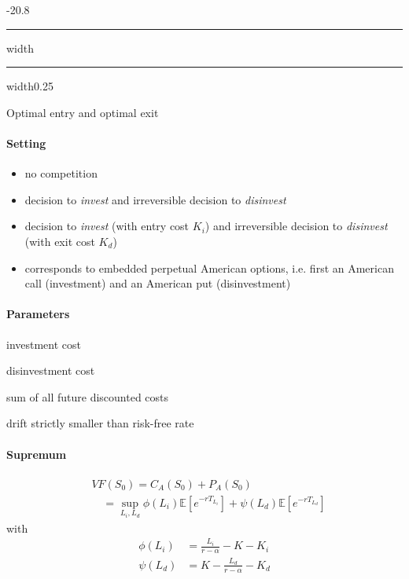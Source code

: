 \documentclass[a4paper,landscape,8pt,fleqn]{scrartcl}
\makeatletter
\renewcommand{\subsection}{\@startsection{subsection}{1}{0mm}%
{-2\baselineskip}{0.8\baselineskip}%
{\hrule depth 0.2pt width\columnwidth\hrule depth0.75pt
width0.25\columnwidth\vspace*{1.2em}\large\bfseries}}
\makeatother
\begin{document}
\begin{multicols*}{4}
\subsection{Optimal entry and optimal exit}

\paragraph{Setting}
\begin{itemize}
\item no competition
\item decision to \textit{invest} and irreversible decision to \textit{disinvest}
\item decision to \textit{invest} (with entry cost $K_i$) and irreversible decision to \textit{disinvest} (with exit cost $K_d$)
\item corresponds to embedded perpetual American options, i.e. first an American call (investment) and an American put (disinvestment)
\end{itemize}

\paragraph{Parameters}
\begin{description}[style=multiline,leftmargin=1cm,font=\textbf]
\item[$K_i$] investment cost
\item[$K_d$] disinvestment cost
\item[$K$] sum of all future discounted costs
\item[$\alpha < r$] drift strictly smaller than risk-free rate
\end{description}

\paragraph{Supremum}
\begin{align*}
& VF(S_0) = C_A(S_0) + P_A(S_0) \\
&\quad = \sup_{L_i, L_d} \phi(L_i) \mathbb{E} \left[ e^{-r T_{L_i}} \right] + \psi(L_d) \mathbb{E} \left[ e^{-r T_{L_d}} \right]
\end{align*}
with
\begin{align*}
\phi(L_i) &= \frac{L_i}{r-\alpha} - K - K_i \\
\psi(L_d) &= K - \frac{L_d}{r-\alpha} - K_d
\end{align*}


\end{multicols*}
\end{document}
